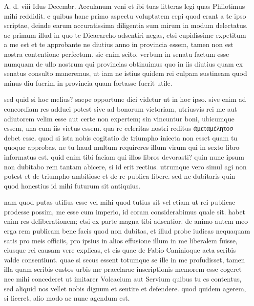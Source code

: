 


 A. d. viii Idus Decembr. Aeculanum veni et ibi tuas litteras legi quas Philotimus mihi reddidit. e quibus hanc primo aspectu voluptatem cepi quod erant a te ipso scriptae, deinde earum accuratissima diligentia sum mirum in modum delectatus. ac primum illud in quo te Dicaearcho adsentiri negas, etsi cupidissime expetitum a me est et te approbante ne diutius anno in provincia essem, tamen non est nostra contentione perfectum. sic enim scito, verbum in senatu factum esse numquam de ullo nostrum qui provincias obtinuimus quo in iis diutius quam ex senatus consulto maneremus, ut iam ne istius quidem rei culpam sustineam quod minus diu fuerim in provincia quam fortasse fuerit utile.

 sed quid si hoc melius? saepe opportune dici videtur ut in hoc ipso. sive enim ad concordiam res adduci potest sive ad bonorum victoriam, utriusvis rei me aut adiutorem velim esse aut certe non expertem; sin vincuntur boni, ubicumque essem, una cum iis victus essem. qua re celeritas nostri reditus ἀμεταμέλητοσ debet esse. quod si ista nobis cogitatio de triumpho iniecta non esset quam tu quoque approbas, ne tu haud multum requireres illum virum qui in sexto libro informatus est. quid enim tibi faciam qui illos libros devorasti? quin nunc ipsum non dubitabo rem tantam abicere, si id erit rectius. utrumque vero simul agi non potest et de triumpho ambitiose et de re publica libere. sed ne dubitaris quin quod honestius id mihi futurum sit antiquius.

 nam quod putas utilius esse vel mihi quod tutius sit vel etiam ut rei publicae prodesse possim, me esse cum imperio, id coram considerabimus quale sit. habet enim res deliberationem; etsi ex parte magna tibi adsentior. de animo autem meo erga rem publicam bene facis quod non dubitas, et illud probe iudicas nequaquam satis pro meis officiis, pro ipsius in alios effusione illum in me liberalem fuisse, eiusque rei causam vere explicas, et eis quae de Fabio Caninioque acta scribis valde consentiunt. quae si secus essent totumque se ille in me profudisset, tamen illa quam scribis custos urbis me praeclarae inscriptionis memorem esse cogeret nec mihi concederet ut imitarer Volcacium aut Servium quibus tu es contentus, sed aliquid nos vellet nobis dignum et sentire et defendere. quod quidem agerem, si liceret, alio modo ac nunc agendum est.

